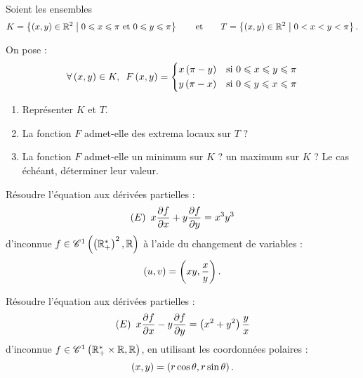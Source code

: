 \begin{exo}
Soient les ensembles \[K=\left\lbrace\left(x,y\right)\in\mathbb{R}^2\;\middle|\;0\leqslant x\leqslant\pi\text{ et }0\leqslant y\leqslant\pi\right\rbrace\qquad\text{et}\qquad T=\left\lbrace\left(x,y\right)\in\mathbb{R}^2\;\middle|\;0<x<y<\pi\right\rbrace.\]

On pose : \[\quantifs{\forall\paren{x,y}\in K}F\paren{x,y}=\begin{dcases}
x\paren{\pi-y} &\text{si }0\leq x\leq y\leq\pi \\
y\paren{\pi-x} &\text{si }0\leq y\leq x\leq\pi
\end{dcases}\]

\begin{enumerate}
    \item Représenter \(K\) et \(T\). \\
    \item La fonction \(F\) admet-elle des extrema locaux sur \(T\) ? \\
    \item La fonction \(F\) admet-elle un minimum sur \(K\) ? un maximum sur \(K\) ? Le cas échéant, déterminer leur valeur.
\end{enumerate}
\end{exo}

\begin{exo}[Exercice 12]
Résoudre l'équation aux dérivées partielles : \[\left(E\right)~x\pdv{f}{x}+y\pdv{f}{y}=x^3y^3\] d'inconnue \(f\in\mathscr{C}^{1}\left(\left(\mathbb{R}_+^*\right)^2,\mathbb{R}\right)\) à l'aide du changement de variables : \[\left(u,v\right)=\left(xy,\dfrac{x}{y}\right).\]
\end{exo}

\begin{exo}[Exercice 13]
Résoudre l'équation aux dérivées partielles : \[\left(E\right)~x\pdv{f}{x}-y\pdv{f}{y}=\left(x^2+y^2\right)\dfrac{y}{x}\] d'inconnue \(f\in\mathscr{C}^{1}\left(\mathbb{R}_+^*\times\mathbb{R},\mathbb{R}\right)\), en utilisant les coordonnées polaires : \[\left(x,y\right)=\left(r\cos\theta,r\sin\theta\right).\] 
\end{exo}